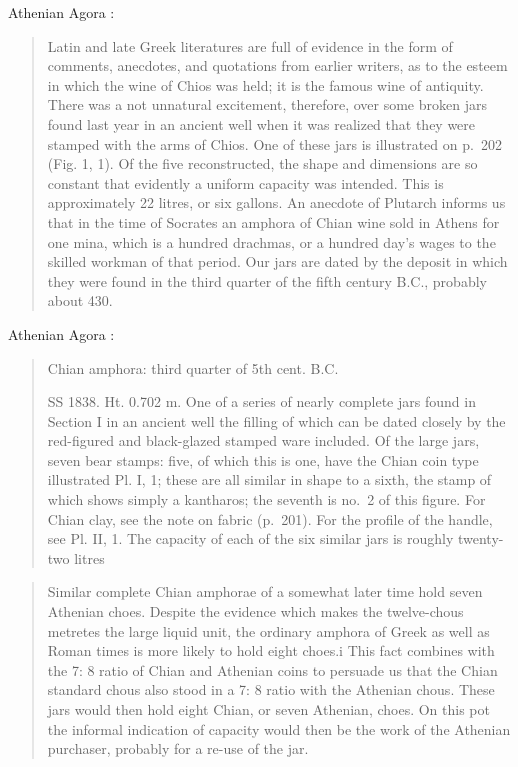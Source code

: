 \documentclass{article}
\begin{document}
Athenian Agora \cite[p.~296]{grace1934}:

\begin{quote}
 Latin and late Greek literatures are full of evidence in the form of comments, anecdotes, and
 quotations from earlier writers, as to the esteem in which the wine of Chios was held;
 it is the famous wine of antiquity.
 There was a not unnatural excitement, therefore,
 over some broken jars found last year in an ancient well when it was realized that
 they were stamped with the arms of Chios. One of these jars is illustrated on p.~202
 (Fig. 1, 1). Of the five reconstructed, the shape and dimensions are so constant that
 evidently a uniform capacity was intended. This is approximately 22 litres, or six
 gallons.
 An anecdote of Plutarch informs us that in the time of Socrates an amphora
 of Chian wine sold in Athens for one mina, which is a hundred drachmas, or a hundred
 day's wages to the skilled workman of that period. Our jars are dated by the deposit
 in which they were found in the third quarter of the fifth century B.C., probably about
 430.
\end{quote}

Athenian Agora \cite[pp.~303--304]{grace1934}:

\begin{quote}
Chian amphora: third quarter of 5th cent. B.C.

SS 1838. Ht. 0.702 m. One of a series of nearly complete jars found in Section I
 in an ancient well the filling of which can be dated closely by the red-figured and
 black-glazed stamped ware included. Of the large jars, seven bear stamps: five, of which
 this is one, have the Chian coin type illustrated Pl. I, 1; these are all similar in shape
  to a sixth, the stamp of which shows simply a kantharos;
 the seventh is no.~2 of this figure. For Chian clay, see the
 note on fabric (p.~201). For the profile of the handle, see
 Pl. II, 1. The capacity of each of the six similar jars is roughly twenty-two litres
\end{quote}



\begin{quote}
 Similar complete Chian amphorae of a somewhat later time hold seven Athenian choes.
 Despite the evidence which makes the twelve-chous metretes the large liquid unit, the ordinary
 amphora of Greek as well as Roman times is more likely to hold eight choes.i This fact combines
 with the 7: 8 ratio of Chian and Athenian coins to persuade us that the Chian standard chous also
 stood in a 7: 8 ratio with the Athenian chous. These jars would then hold eight Chian, or seven
 Athenian, choes. On this pot the informal indication of capacity would then be the work of the
 Athenian purchaser, probably for a re-use of the jar.
 \end{quote}
\end{document}

